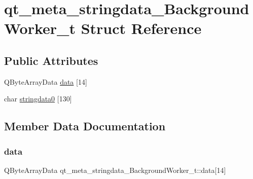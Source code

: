 \hypertarget{structqt__meta__stringdata___background_worker__t}{}\section{qt\+\_\+meta\+\_\+stringdata\+\_\+\+Background\+Worker\+\_\+t Struct Reference}
\label{structqt__meta__stringdata___background_worker__t}
\subsection*{Public Attributes}
\begin{DoxyCompactItemize}
\item 
Q\+Byte\+Array\+Data \mbox{\hyperlink{structqt__meta__stringdata___background_worker__t_a13d490b571f6ff47cec31ede585c682f}{data}} \mbox{[}14\mbox{]}
\item 
char \mbox{\hyperlink{structqt__meta__stringdata___background_worker__t_ab6a4c3409d1a516f5f72191adb25fbd3}{stringdata0}} \mbox{[}130\mbox{]}
\end{DoxyCompactItemize}


\subsection{Member Data Documentation}
\mbox{\label{structqt__meta__stringdata___background_worker__t_a13d490b571f6ff47cec31ede585c682f}} 
\subsubsection{\texorpdfstring{data}{data}}
{\footnotesize\ttfamily Q\+Byte\+Array\+Data qt\+\_\+meta\+\_\+stringdata\+\_\+\+Background\+Worker\+\_\+t\+::data\mbox{[}14\mbox{]}}

\mbox{\label{structqt__meta__stringdata___background_worker__t_ab6a4c3409d1a516f5f72191adb25fbd3}} 
